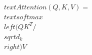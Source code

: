 \documentclass[preview]{standalone}
\begin{document}
\begin{align*}
\quad\\text{Attention}(Q, K, V) = \quad\\text{softmax}\quad\\left( QK^T /\quad\\sqrt{d_k} \quad\\right)V
\end{align*}
\end{document}
